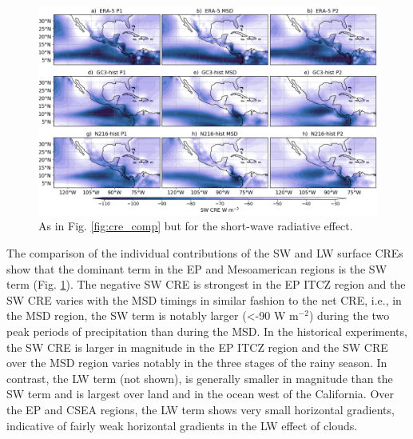 \begin{figure}[t!]
\includegraphics[width=\linewidth]{figures/fig4_swclim_3.png}
\caption[Short-wave cloud radiative effect composites]{As in Fig. \ref{fig:cre_comp} but for the short-wave radiative effect.}
\label{fig:sw_comp}
\end{figure}

The comparison of the individual contributions of the SW and LW surface CREs show that the dominant term in the EP and Mesoamerican regions is the SW term (Fig. \ref{fig:sw_comp}). The negative SW CRE is strongest in the EP ITCZ region and the SW CRE varies with the MSD timings in similar fashion to the net CRE, i.e., in the MSD region, the SW term is notably larger (<-90 W m$^{-2}$) during the two peak periods of precipitation than during the MSD.
In the historical experiments, the SW CRE is larger in magnitude in the EP ITCZ region and the SW CRE over the MSD region varies notably in the three stages of the rainy season.
In contrast, the LW term (not shown), is generally smaller in magnitude than the SW term and is largest over land and in the ocean west of the California. Over the EP and CSEA regions, the LW term shows very small horizontal gradients, indicative of fairly weak horizontal gradients in the LW effect of clouds. 
%

